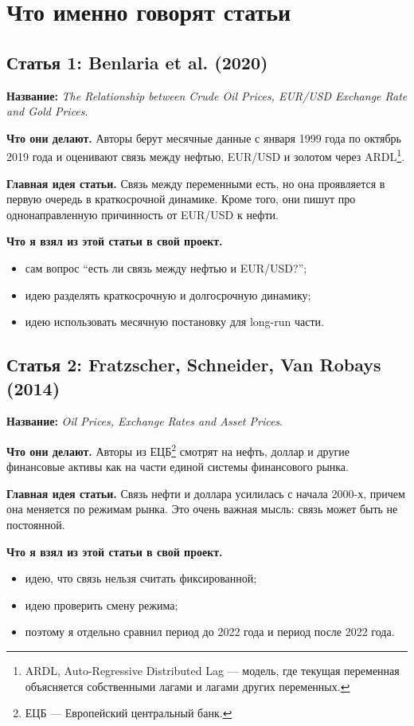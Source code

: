 \documentclass[a4paper,12pt]{article}
\begin{document}
\section{Что именно говорят статьи}

\subsection{Статья 1: Benlaria et al. (2020)}
\textbf{Название:} \textit{The Relationship between Crude Oil Prices, EUR/USD Exchange Rate and Gold Prices}.

\textbf{Что они делают.}
Авторы берут месячные данные с января 1999 года по октябрь 2019 года и оценивают связь между нефтью, EUR/USD и золотом через ARDL\footnote{ARDL, Auto-Regressive Distributed Lag --- модель, где текущая переменная объясняется собственными лагами и лагами других переменных.}.

\textbf{Главная идея статьи.}
Связь между переменными есть, но она проявляется в первую очередь в краткосрочной динамике. Кроме того, они пишут про однонаправленную причинность от EUR/USD к нефти.

\textbf{Что я взял из этой статьи в свой проект.}
\begin{itemize}
    \item сам вопрос ``есть ли связь между нефтью и EUR/USD?'';
    \item идею разделять краткосрочную и долгосрочную динамику;
    \item идею использовать месячную постановку для long-run части.
\end{itemize}

\subsection{Статья 2: Fratzscher, Schneider, Van Robays (2014)}
\textbf{Название:} \textit{Oil Prices, Exchange Rates and Asset Prices}.

\textbf{Что они делают.}
Авторы из ЕЦБ\footnote{ЕЦБ --- Европейский центральный банк.} смотрят на нефть, доллар и другие финансовые активы как на части единой системы финансового рынка.

\textbf{Главная идея статьи.}
Связь нефти и доллара усилилась с начала 2000-х, причем она меняется по режимам рынка. Это очень важная мысль: связь может быть не постоянной.

\textbf{Что я взял из этой статьи в свой проект.}
\begin{itemize}
    \item идею, что связь нельзя считать фиксированной;
    \item идею проверить смену режима;
    \item поэтому я отдельно сравнил период до 2022 года и период после 2022 года.
\end{itemize}
\end{document}
